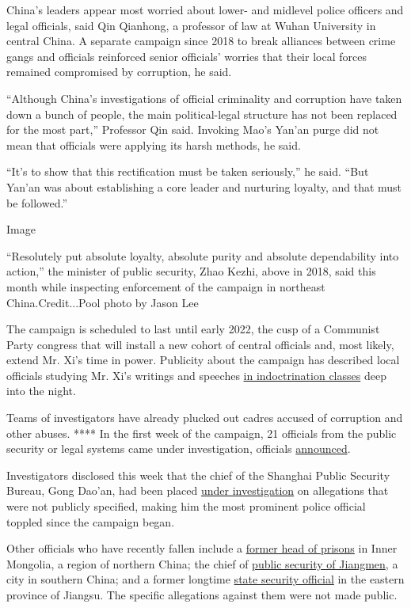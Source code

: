 China's leaders appear most worried about lower- and midlevel police
officers and legal officials, said Qin Qianhong, a professor of law at
Wuhan University in central China. A separate campaign since 2018 to
break alliances between crime gangs and officials reinforced senior
officials' worries that their local forces remained compromised by
corruption, he said.

``Although China's investigations of official criminality and corruption
have taken down a bunch of people, the main political-legal structure
has not been replaced for the most part,'' Professor Qin said. Invoking
Mao's Yan'an purge did not mean that officials were applying its harsh
methods, he said.

``It's to show that this rectification must be taken seriously,'' he
said. ``But Yan'an was about establishing a core leader and nurturing
loyalty, and that must be followed.''

Image

``Resolutely put absolute loyalty, absolute purity and absolute
dependability into action,'' the minister of public security, Zhao
Kezhi, above in 2018, said this month while inspecting enforcement of
the campaign in northeast China.Credit...Pool photo by Jason Lee

The campaign is scheduled to last until early 2022, the cusp of a
Communist Party congress that will install a new cohort of central
officials and, most likely, extend Mr. Xi's time in power. Publicity
about the campaign has described local officials studying Mr. Xi's
writings and speeches
\href{https://www.thepaper.cn/newsDetail_forward_8685469}{in
indoctrination classes} deep into the night.

Teams of investigators have already plucked out cadres accused of
corruption and other abuses. **** In the first week of the campaign, 21
officials from the public security or legal systems came under
investigation, officials
\href{https://mp.weixin.qq.com/s/0vI6lilmapIoCGDbzGANDw}{announced}.

Investigators disclosed this week that the chief of the Shanghai Public
Security Bureau, Gong Dao'an, had been placed
\href{http://www.ccdi.gov.cn/toutiao/202008/t20200818_223984.html}{under
investigation} on allegations that were not publicly specified, making
him the most prominent police official toppled since the campaign began.

Other officials who have recently fallen include a
\href{http://www.ccdi.gov.cn/yaowen/202006/t20200622_220588.html}{former
head of prisons} in Inner Mongolia, a region of northern China; the
chief of
\href{http://fanfu.people.com.cn/n1/2020/0712/c64371-31779959.html}{public
security of Jiangmen}, a city in southern China; and a former longtime
\href{https://baijiahao.baidu.com/s?id=1672115211523911540\&wfr=spider\&for=pc}{state
security official} in the eastern province of Jiangsu. The specific
allegations against them were not made public.

